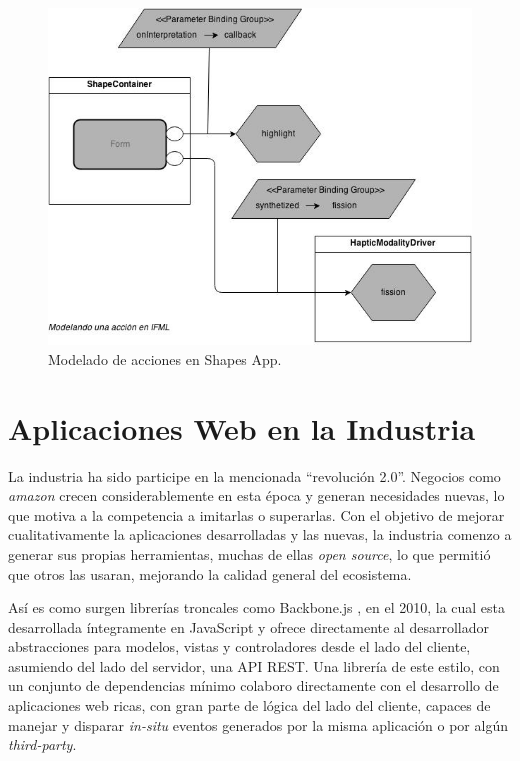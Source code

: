 \begin{center}
  \begin{figure}[h]
    \includegraphics[scale=1,width=\textwidth]{gfx/ifml_example}
    \caption{Modelado de acciones en Shapes App.}
    \label{fig:extension_ifml_example}
  \end{figure}
\end{center}

\section{Aplicaciones Web en la Industria} \label{sec:extension_industria_intro}

La industria ha sido participe en la mencionada ``revolución 2.0''. Negocios como \emph{amazon} crecen considerablemente en esta época y generan necesidades nuevas, lo que motiva a la competencia a imitarlas o superarlas. Con el objetivo de mejorar cualitativamente la aplicaciones desarrolladas y las nuevas, la industria comenzo a generar sus propias herramientas, muchas de ellas \emph{open source}, lo que permitió que otros las usaran, mejorando la calidad general del ecosistema.

Así es como surgen librerías troncales como Backbone.js \citep{ind:backbone}, en el 2010, la cual esta desarrollada íntegramente en JavaScript y ofrece directamente al desarrollador abstracciones para modelos, vistas y controladores desde el lado del cliente, asumiendo del lado del servidor, una API REST. Una librería de este estilo, con un conjunto de dependencias mínimo colaboro directamente con el desarrollo de aplicaciones web ricas, con gran parte de lógica del lado del cliente, capaces de manejar y disparar \emph{in-situ} eventos generados por la misma aplicación o por algún \emph{third-party}. 

